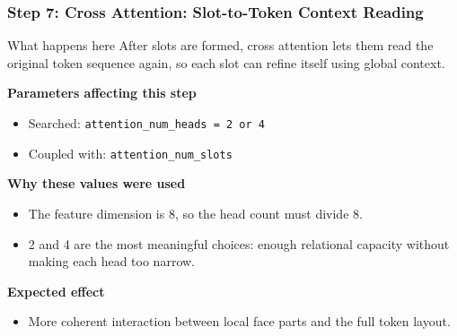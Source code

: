 \documentclass[aspectratio=169]{beamer}
\newcommand{\stepheader}[2]{
    \frametitle{Step #1: #2}
}
\begin{document}
\begin{frame}
    \stepheader{7}{Cross Attention: Slot-to-Token Context Reading}
    \small
    \begin{block}{What happens here}
        After slots are formed, cross attention lets them read the original token sequence again, so each slot can refine itself using global context.
    \end{block}
    \textbf{Parameters affecting this step}
    \begin{itemize}
        \item Searched: \texttt{attention\_num\_heads = 2 or 4}
        \item Coupled with: \texttt{attention\_num\_slots}
    \end{itemize}
    \textbf{Why these values were used}
    \begin{itemize}
        \item The feature dimension is 8, so the head count must divide 8.
        \item 2 and 4 are the most meaningful choices: enough relational capacity without making each head too narrow.
    \end{itemize}
    \textbf{Expected effect}
    \begin{itemize}
        \item More coherent interaction between local face parts and the full token layout.
    \end{itemize}
\end{frame}
\end{document}
